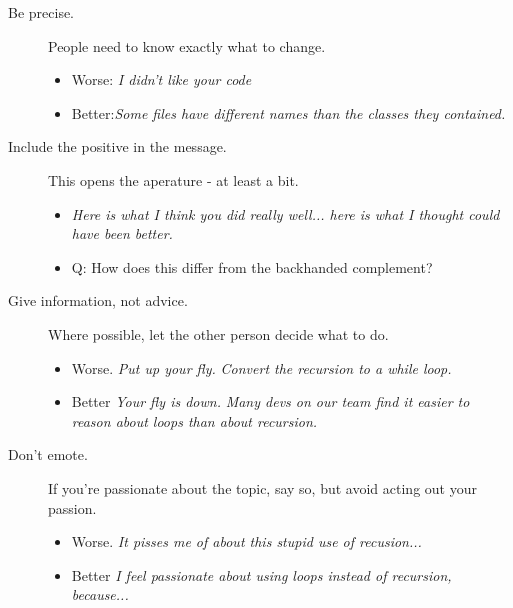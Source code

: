 \documentclass{article}
\begin{document}
\begin{tiny}
\begin{multicols}{3}
\begin{tcolorbox}
\begin{description}
\begin{itemize}
                \end{itemize}
            \item[Be precise.] People need to know exactly what to change.
                \begin{itemize}
                   \item Worse: \emph{I didn't like your code} 
                   \item Better:\emph{Some files have different names than the classes they contained.} 
                \end{itemize}
            \item[Include the positive in the message.] This opens the aperature - at least a bit.
                \begin{itemize}
                    \item \emph{Here is what I think you did really well... here is what I thought could have been better.}
                    \item Q: How does this differ from the backhanded complement?
                \end{itemize}
            \item[Give information, not advice.] Where possible, let the other person decide what to do.
                \begin{itemize}
                    \item Worse. \emph{Put up your fly.} \emph{Convert the recursion to a while loop.}
                    \item Better \emph{Your fly is down.} \emph{Many devs on our team find it easier to reason about loops than about recursion.}
                \end{itemize}
            \item[Don't emote.] If you're passionate about the topic, say so, but avoid acting out your passion.
                \begin{itemize}
                    \item Worse. \emph{It pisses me of about this stupid use of recusion...}
                    \item Better \emph{I feel passionate about using loops instead of recursion, because...}
                \end{itemize}
        \end{description}

    \end{tcolorbox}

\end{multicols}


\end{tiny}
\end{document}
